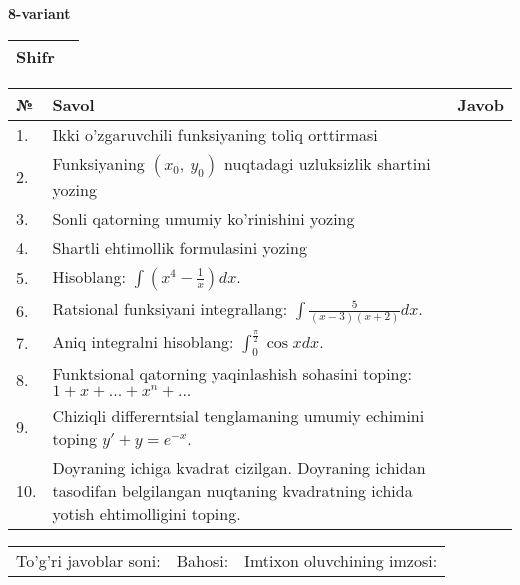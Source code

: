 \documentclass{article}
\begin{document}
  \egroup
  
  \newpage
  
  
  \textbf{8-variant}\\
  
  \bgroup
  \def\arraystretch{1.6} %
  
  \begin{tabular}{|m{5.7cm}|m{9.5cm}|}
  \hline
  Shifr & \\
  \hline
  \end{tabular}
  
  \vspace{1cm}
  
  \begin{tabular}{|m{0.7cm}|m{10cm}|m{4cm}|}
  \hline
  № & Savol & Javob \\
  \hline
  1. & Ikki o'zgaruvchili funksiyaning toliq orttirmasi &  \\
  \hline
  2. & Funksiyaning \((x_{0},\ y_{0})\) nuqtadagi uzluksizlik shartini yozing &  \\
  \hline
  3. & Sonli qatorning umumiy ko'rinishini yozing &  \\
  \hline
  4. & Shartli ehtimollik formulasini yozing &  \\
  \hline
  5. & Hisoblang: \(\int \left( x^{4} - \frac{1}{x} \right)dx\). &  \\
  \hline
  6. & Ratsional funksiyani integrallang: \(\int {\frac{5}{(x - 3)(x + 2)}dx}\). &  \\
  \hline
  7. & Aniq integralni hisoblang: \(\int_{0}^{\frac{\pi}{2}}{\cos xdx}\). &  \\
  \hline
  8. & Funktsional qatorning yaqinlashish sohasini toping:\(1 + x + ... + x^{n} + ...\) &  \\
  \hline
  9. & Chiziqli differerntsial tenglamaning umumiy echimini toping \(y' + y = e^{- x}\). &  \\
  \hline
  10. & Doyraning ichiga kvadrat cizilgan. Doyraning ichidan tasodifan belgilangan nuqtaning kvadratning ichida yotish ehtimolligini toping. &  \\
  \hline
  \end{tabular}
  
  \vspace{1cm}
  
  \begin{tabular}{lll}
  To'g'ri javoblar soni: \underline{\hspace{1.5cm}} & 
  Bahosi: \underline{\hspace{1.5cm}} & 
  Imtixon oluvchining imzosi: \underline{\hspace{2cm}} \\
  \end{tabular}
  
\end{document}
